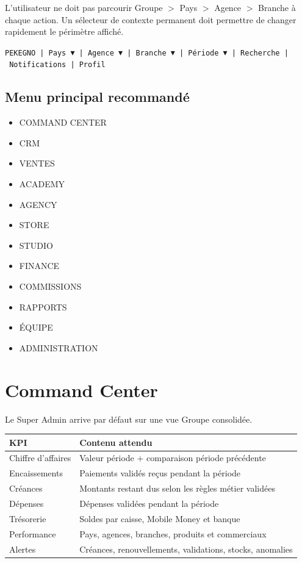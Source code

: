 \documentclass[11pt,a4paper]{article}
\newcommand{\tableheader}[2]{\textbf{#1} & \textbf{#2} \\ \hline}
\begin{document}
L'utilisateur ne doit pas parcourir Groupe $>$ Pays $>$ Agence $>$ Branche à chaque action. Un sélecteur de contexte permanent doit permettre de changer rapidement le périmètre affiché.

\begin{center}
\texttt{PEKEGNO~|~Pays~$\blacktriangledown$~|~Agence~$\blacktriangledown$~|~Branche~$\blacktriangledown$~|~Période~$\blacktriangledown$~|~Recherche~|~Notifications~|~Profil}
\end{center}

\subsection{Menu principal recommandé}

\begin{itemize}
  \item COMMAND CENTER
  \item CRM
  \item VENTES
  \item ACADEMY
  \item AGENCY
  \item STORE
  \item STUDIO
  \item FINANCE
  \item COMMISSIONS
  \item RAPPORTS
  \item ÉQUIPE
  \item ADMINISTRATION
\end{itemize}

\section{Command Center}

Le Super Admin arrive par défaut sur une vue Groupe consolidée.

\begin{tabularx}{\textwidth}{|l|X|}
\hline
\tableheader{KPI}{Contenu attendu}
Chiffre d'affaires & Valeur période + comparaison période précédente \\ \hline
Encaissements & Paiements validés reçus pendant la période \\ \hline
Créances & Montants restant dus selon les règles métier validées \\ \hline
Dépenses & Dépenses validées pendant la période \\ \hline
Trésorerie & Soldes par caisse, Mobile Money et banque \\ \hline
Performance & Pays, agences, branches, produits et commerciaux \\ \hline
Alertes & Créances, renouvellements, validations, stocks, anomalies \\ \hline
\end{tabularx}
\end{document}
